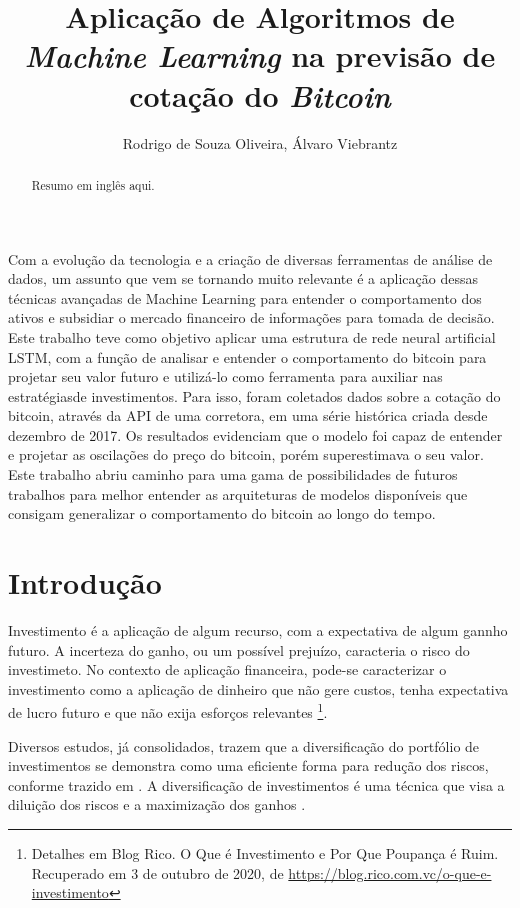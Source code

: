 \documentclass[12pt]{article}
\title{
  Aplicação de Algoritmos de \textit{Machine Learning} na previsão de cotação do
  \textit{Bitcoin}
}
\author{
  Rodrigo de Souza Oliveira\inst{1}, 
  Álvaro Viebrantz \inst{1}
}
\begin{document}
 

\maketitle

\begin{abstract}
  Resumo em inglês aqui.
\end{abstract}
     
\begin{resumo} 
Com a evolução da tecnologia e a criação de diversas ferramentas de análise de
dados, um assunto que vem se tornando muito relevante é a aplicação dessas 
técnicas avançadas de Machine Learning para entender o comportamento dos ativos 
e subsidiar o mercado financeiro de informações para tomada de decisão. Este 
trabalho teve como objetivo aplicar uma estrutura de rede neural artificial 
LSTM, com a função de analisar e entender o comportamento do bitcoin para 
projetar seu valor futuro e utilizá-lo como ferramenta para auxiliar nas 
estratégiasde investimentos. Para isso, foram coletados dados sobre a cotação 
do bitcoin, através da API de uma corretora, em uma série histórica criada desde
dezembro de 2017. Os resultados evidenciam que o modelo foi capaz de entender e 
projetar as oscilações do preço do bitcoin, porém superestimava o seu valor. 
Este trabalho abriu caminho para uma gama de possibilidades de futuros trabalhos
para melhor entender as arquiteturas de modelos disponíveis que consigam 
generalizar o comportamento do bitcoin ao longo do tempo.
\end{resumo}


\section{Introdução}

Investimento é a aplicação de algum recurso, com a expectativa de algum gannho 
futuro. A incerteza do ganho, ou um possível prejuízo, caracteria o risco do
investimeto. No contexto de aplicação financeira, pode-se caracterizar o 
investimento como a aplicação de dinheiro que não gere custos, tenha expectativa
de lucro futuro e que não exija esforços relevantes \footnote{Detalhes em Blog 
Rico. O Que é Investimento e Por Que Poupança é Ruim. Recuperado em 3 de
outubro de 2020, de \url{https://blog.rico.com.vc/o-que-e-investimento}}.

Diversos estudos, já consolidados, trazem que a diversificação do portfólio
de investimentos se demonstra como uma eficiente forma para redução dos riscos, 
conforme trazido em \cite{oda1998estudo}. A diversificação de investimentos é 
uma técnica que visa a diluição dos riscos e a maximização dos ganhos
\cite{btg:2017}.
\end{document}

